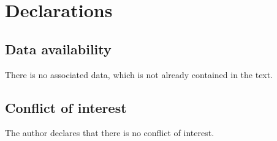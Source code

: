 \documentclass[twoside,11pt]{amsart}
\numberwithin{equation}{section}
\theoremstyle{definition}
\begin{document}
\section*{Declarations}

\subsection*{Data availability}
There is no associated data, which is not already contained in the text.

\subsection*{Conflict of interest} The author declares that there is no conflict of interest.


\end{document}
